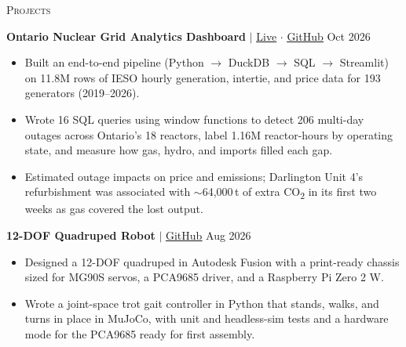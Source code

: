 \documentclass[a4paper]{article}
\newcommand{\lineunder} {
    \par\vspace*{-2pt}
    \noindent\hrulefill
    \par\vspace*{2pt}
}
\newcommand{\header}[1]{
    \vspace*{3pt}
    {\hspace*{-4pt}\large\textsc{#1}}
    \lineunder
}
\begin{document}
\vspace{1.5mm}
\fi

\header{Projects}
\vspace{1.5mm}

\textbf{Ontario Nuclear Grid Analytics Dashboard} $|$
\href{https://nuclear-dashboard.streamlit.app}{\underline{Live}} $\cdot$
\href{https://github.com/danielzhang122/ontario-nuclear-dashboard}{\underline{GitHub}}
\hfill Oct 2026
\vspace{1mm}
\vspace{1mm}
\begin{itemize}
    \item Built an end-to-end pipeline (Python $\rightarrow$ DuckDB $\rightarrow$ SQL $\rightarrow$ Streamlit) on 11.8M rows of IESO hourly generation, intertie, and price data for 193 generators (2019--2026).
    \item Wrote 16 SQL queries using window functions to detect 206 multi-day outages across Ontario's 18 reactors, label 1.16M reactor-hours by operating state, and measure how gas, hydro, and imports filled each gap.
    \item Estimated outage impacts on price and emissions; Darlington Unit 4's refurbishment was associated with $\sim$64,000\,t of extra CO\textsubscript{2} in its first two weeks as gas covered the lost output.
\end{itemize}
\vspace{1.5mm}

\textbf{12-DOF Quadruped Robot} $|$
\href{https://github.com/danielzhang122/quadruped-robot}{\underline{GitHub}}
\hfill Aug 2026
\vspace{1mm}
\begin{itemize}
    \item Designed a 12-DOF quadruped in Autodesk Fusion with a print-ready chassis sized for MG90S servos, a PCA9685 driver, and a Raspberry Pi Zero 2 W.
    \item Wrote a joint-space trot gait controller in Python that stands, walks, and turns in place in MuJoCo, with unit and headless-sim tests and a hardware mode for the PCA9685 ready for first assembly.
\end{itemize}
\vspace{1.5mm}
\end{document}
